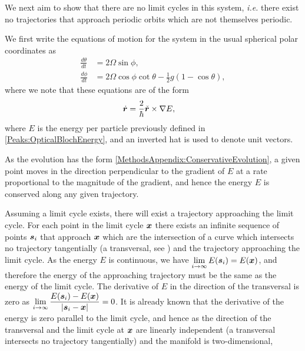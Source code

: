 We next aim to show that there are no limit cycles in this system, \emph{i.e.} there exist no trajectories that approach periodic orbits which are not themselves periodic.

We first write the equations of motion for the system in the usual spherical polar coordinates as
\begin{align}
    \frac{d \theta}{dt} &= 2 \Omega \sin\phi, \\
    \frac{d \phi}{dt} &= 2 \Omega \cos\phi \cot\theta - \frac{1}{2} g (1-\cos\theta),
\end{align}
where we note that these equations are of the form
\begin{align}
    \dot{\vect{r}} &= \frac{2}{\hbar} \unitvec{r} \times \nabla E, \label{MethodsAppendix:ConservativeEvolution}
\end{align}
where $E$ is the energy per particle previously defined in \eqref{Peaks:OpticalBlochEnergy}, and an inverted hat is used to denote unit vectors.

As the evolution has the form \eqref{MethodsAppendix:ConservativeEvolution}, a given point moves in the direction perpendicular to the gradient of $E$ at a rate proportional to the magnitude of the gradient, and hence the energy $E$ is conserved along any given trajectory.

Assuming a limit cycle exists, there will exist a trajectory approaching the limit cycle. For each point in the limit cycle $\bm{x}$ there exists an infinite sequence of points $\bm{s}_i$ that approach $\bm{x}$ which are the intersection of a curve which intersects no trajectory tangentially (a transversal, see \citep{Schwartz:1963}) and the trajectory approaching the limit cycle.  As the energy $E$ is continuous, we have $\displaystyle \lim_{i\rightarrow\infty}E(\bm{s}_i) = E(\bm{x})$, and therefore the energy of the approaching trajectory must be the same as the energy of the limit cycle.  The derivative of $E$ in the direction of the transversal is zero as $\displaystyle \lim_{i\rightarrow\infty} \frac{E(\bm{s}_i) - E(\bm{x})}{\left|\bm{s}_i - \bm{x}\right|} = 0$. It is already known that the derivative of the energy is zero parallel to the limit cycle, and hence as the direction of the transversal and the limit cycle at $\bm{x}$ are linearly independent (a transversal intersects no trajectory tangentially) and the manifold is two-dimensional, 


\parasep

